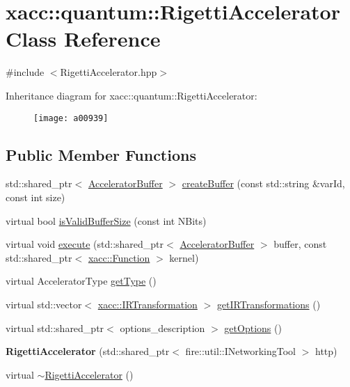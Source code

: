 \hypertarget{a00939}{}\section{xacc\+:\+:quantum\+:\+:Rigetti\+Accelerator Class Reference}
\label{a00939}


{\ttfamily \#include $<$Rigetti\+Accelerator.\+hpp$>$}

Inheritance diagram for xacc\+:\+:quantum\+:\+:Rigetti\+Accelerator\+:\begin{figure}[H]
\begin{center}
\leavevmode
\texttt{[image: a00939]}
\end{center}
\end{figure}
\subsection*{Public Member Functions}
\begin{DoxyCompactItemize}
\item 
std\+::shared\+\_\+ptr$<$ \hyperlink{a01123}{Accelerator\+Buffer} $>$ \hyperlink{a00939_a731551c94b1abef40d2cf032e8712df6}{create\+Buffer} (const std\+::string \&var\+Id, const int size)
\item 
virtual bool \hyperlink{a00939_a61352c07062597aad2393fbeed4cc025}{is\+Valid\+Buffer\+Size} (const int N\+Bits)
\item 
virtual void \hyperlink{a00939_afce7bbd1b0f04300a9920952e9d12ef4}{execute} (std\+::shared\+\_\+ptr$<$ \hyperlink{a01123}{Accelerator\+Buffer} $>$ buffer, const std\+::shared\+\_\+ptr$<$ \hyperlink{a01151}{xacc\+::\+Function} $>$ kernel)
\item 
virtual Accelerator\+Type \hyperlink{a00939_aab0d4674da5273d55407b9ab77cde890}{get\+Type} ()
\item 
virtual std\+::vector$<$ \hyperlink{a01179}{xacc\+::\+I\+R\+Transformation} $>$ \hyperlink{a00939_a443683a1dfb000603c640b2ee303cf66}{get\+I\+R\+Transformations} ()
\item 
virtual std\+::shared\+\_\+ptr$<$ options\+\_\+description $>$ \hyperlink{a00939_a9ee9e62aecbccf193894ca3388676f9f}{get\+Options} ()
\item 
\mbox{\label{a00939_aa92ba39441ec9c261fbddee23a84d6ac}} 
{\bfseries Rigetti\+Accelerator} (std\+::shared\+\_\+ptr$<$ fire\+::util\+::\+I\+Networking\+Tool $>$ http)
\item 
virtual \hyperlink{a00939_a7c86895d1c29afa8b7e18476144a3fcf}{$\sim$\+Rigetti\+Accelerator} ()
\end{DoxyCompactItemize}
